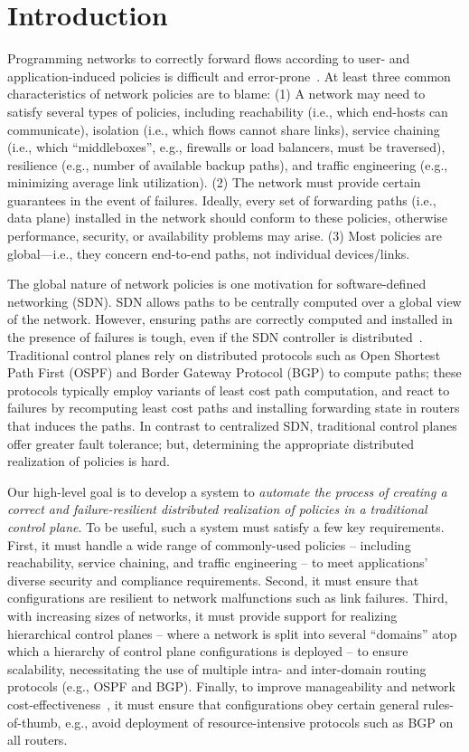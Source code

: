 \section{Introduction}
Programming networks to correctly forward flows according to user- and
application-induced policies is difficult and
error-prone~\cite{troubleshooting, bgpmisconfig}. 
At least three
common characteristics of network policies are to blame: (1) A network
may need to satisfy several types of policies, including reachability
(i.e., which end-hosts can communicate), isolation (i.e., which flows
cannot share links), service chaining (i.e., which ``middleboxes'',
e.g., firewalls or load balancers, must be traversed), resilience
(e.g., number of available backup paths), and traffic engineering
(e.g., minimizing average link utilization). (2) The network must
provide certain guarantees in the event of failures. Ideally, every
set of forwarding paths (i.e., data plane) installed in the network
should conform to these policies, otherwise performance, security, or
availability problems may arise. (3) Most policies are global---i.e.,
they concern end-to-end paths, not individual devices/links.

The global nature of network policies is one motivation for
software-defined networking (SDN). SDN allows paths to be centrally
computed over a global view of the network. However, 
ensuring paths are correctly computed and installed in the
presence of failures is tough, even if the SDN controller is
distributed~\cite{hasdn}.
Traditional control planes rely on distributed protocols such as Open
Shortest Path First (OSPF) and Border Gateway Protocol (BGP) to
compute paths; these protocols typically employ variants of least cost
path computation, and react to failures by recomputing least cost
paths and installing forwarding state in routers that induces the
paths. In contrast to centralized SDN, traditional control planes
offer greater fault tolerance; but, determining the appropriate
distributed realization of policies is hard.

Our high-level goal is to develop a system to {\em automate the
  process of creating a correct and failure-resilient distributed
  realization of policies in a traditional control plane}. To be
useful, such a system must satisfy a few key requirements. First, it
must handle a wide range of commonly-used policies -- including
reachability, service chaining, and traffic engineering -- to meet
applications' diverse security and compliance requirements. Second, it
must ensure that configurations are resilient to network malfunctions
such as link failures. Third, with increasing sizes of networks, it
must provide support for realizing hierarchical control planes --
where a network is split into several ``domains'' atop which a
hierarchy of control plane configurations is deployed -- to ensure
scalability, necessitating the use of multiple intra- and inter-domain
routing protocols (e.g., OSPF and BGP). Finally, to improve
manageability and network
cost-effectiveness~\cite{mpa:imc15,complexity:sigcomm11}, it must
ensure that configurations obey certain general rules-of-thumb, e.g.,
avoid deployment of resource-intensive protocols such as BGP on all
routers.


